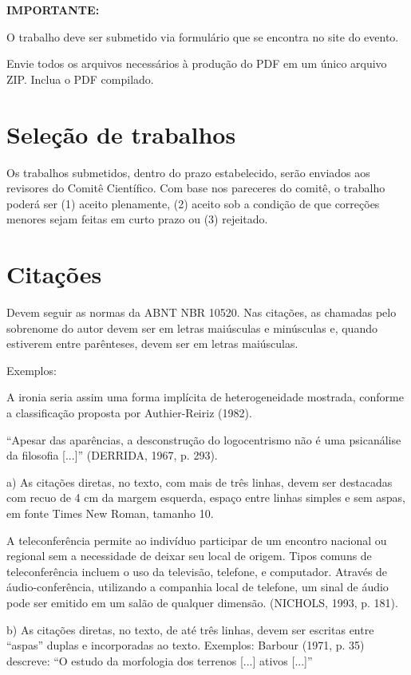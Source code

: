 \documentclass[a4paper,11pt]{article}
\begin{document}
{{\bf IMPORTANTE:

O trabalho deve ser submetido via formulário que se encontra no site do evento.

Envie todos os arquivos necessários à produção do PDF em um único arquivo ZIP. Inclua o PDF compilado.
}


\section*{Seleção de trabalhos}

Os trabalhos submetidos, dentro do prazo estabelecido, serão enviados aos revisores do Comitê Científico. Com base nos pareceres do comitê, o trabalho poderá ser (1) aceito plenamente, (2) aceito sob a condição de que correções menores sejam feitas em curto prazo ou (3) rejeitado.


\section*{Citações}
Devem seguir as normas da ABNT NBR 10520. Nas citações, as chamadas pelo sobrenome do autor devem ser em letras maiúsculas e minúsculas e, quando estiverem entre parênteses, devem ser em letras maiúsculas.

Exemplos:

A ironia seria assim uma forma implícita de heterogeneidade mostrada, conforme a classificação proposta por Authier-Reiriz (1982).

\vskip 0.2cm
``Apesar das aparências, a desconstrução do logocentrismo não é uma psicanálise da filosofia [...]'' (DERRIDA, 1967, p. 293).

\vskip 0.2cm
a) As citações diretas, no texto, com mais de três linhas, devem ser destacadas com recuo de 4 cm da margem esquerda, espaço entre linhas simples e sem aspas, em fonte Times New Roman, tamanho 10.

\begin{quoting}
A teleconferência permite ao indivíduo participar de um encontro nacional ou regional sem a necessidade de deixar seu local de origem. Tipos comuns de teleconferência incluem o uso da televisão, telefone, e computador. Através de áudio-conferência, utilizando a companhia local de telefone, um sinal de áudio pode ser emitido em um salão de qualquer dimensão. (NICHOLS, 1993, p. 181).
\end{quoting}

\vskip 0.2cm
b) As citações diretas, no texto, de até três linhas, devem ser escritas entre ``aspas'' duplas e incorporadas ao texto.
Exemplos:
Barbour (1971, p. 35) descreve: ``O estudo da morfologia dos terrenos [...] ativos [...]''

}
\end{document}
